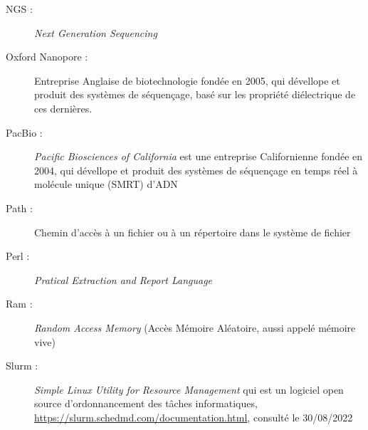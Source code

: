 \begin{description}
    \item[NGS :] \emph{Next Generation Sequencing}
    \item[Oxford Nanopore :] Entreprise Anglaise de biotechnologie fondée en 2005, qui dévellope et produit des systèmes de séquençage, basé sur les propriété diélectrique de ces dernières.
    \item[PacBio :] \emph{Pacific Biosciences of California} est une entreprise Californienne fondée en 2004, qui dévellope et produit des systèmes de séquençage en temps réel à molécule unique (SMRT) d'ADN
    \item[Path : ] Chemin d'accès à un fichier ou à un répertoire dans le système de fichier
    \item[Perl :] \emph{Pratical Extraction and Report Language}
    \item[Ram :] \emph{Random Access Memory} (Accès Mémoire Aléatoire, aussi appelé mémoire vive)
    \item[Slurm :] \emph{Simple Linux Utility for Resource Management} qui est un logiciel open source d'ordonnancement des tâches informatiques, \href{https://slurm.schedmd.com/documentation.html}{https://slurm.schedmd.com/documentation.html}, consulté le 30/08/2022
\end{description}